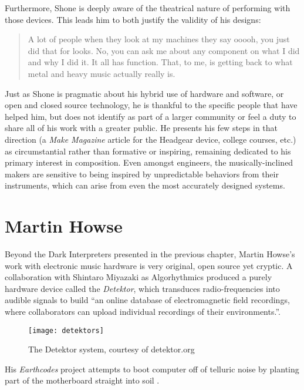 Furthermore, Shone is deeply aware of the theatrical nature of performing with those devices. This leads him to both justify the validity of his designs: 

\begin{quote}
	A lot of people when they look at my machines they say ooooh, you just did that for looks. No, you can ask me about any component on what I did and why I did it. It all has function. That, to me, is getting back to what metal and heavy music actually really is.
\end{quote}

Just as Shone is pragmatic about his hybrid use of hardware and software, or open and closed source technology, he is thankful to the specific people that have helped him, but does not identify as part of a larger community or feel a duty to share all of his work with a greater public. He presents his few steps in that direction (a \textit{Make Magazine} article for the Headgear device, college courses, etc.) as circumstantial rather than formative or inspiring, remaining dedicated to his primary interest in composition. Even amongst engineers, the musically-inclined makers are sensitive to being inspired by unpredictable behaviors from their instruments, which can arise from even the most accurately designed systems. 

\section{Martin Howse}

Beyond the Dark Interpreters presented in the previous chapter, Martin Howse's work with electronic music hardware is very original, open source yet cryptic. A collaboration with Shintaro Miyazaki as Algorhythmics produced a purely hardware device called the \textit{Detektor}, which transduces radio-frequencies into audible signals to build ``an online database of electromagnetic field recordings, where collaborators can upload individual recordings of their environments.''\citep{miyazaki2010}. 

\begin{figure}[H]
	  \centering
	    \texttt{[image: detektors]}
	    \caption{The Detektor system, courtesy of detektor.org}
	\end{figure}

His \textit{Earthcodes} project attempts to boot computer off of telluric noise by planting part of the motherboard straight into soil \citep{whitelaw2013}. 

